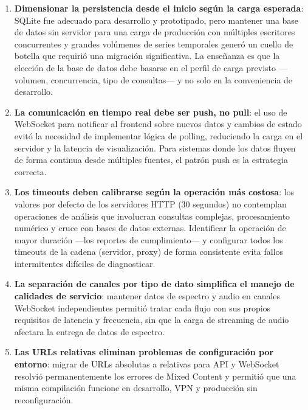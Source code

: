 \begin{enumerate}
    \item \textbf{Dimensionar la persistencia desde el inicio según la carga
    esperada}: SQLite fue adecuado para desarrollo y prototipado, pero
    mantener una base de datos sin servidor para una carga de producción con
    múltiples escritores concurrentes y grandes volúmenes de series temporales
    generó un cuello de botella que requirió una migración significativa. La
    enseñanza es que la elección de la base de datos debe basarse en el perfil
    de carga previsto —volumen, concurrencia, tipo de consultas— y no solo en
    la conveniencia de desarrollo.

    \item \textbf{La comunicación en tiempo real debe ser push, no pull}: el
    uso de WebSocket para notificar al frontend sobre nuevos datos y cambios
    de estado evitó la necesidad de implementar lógica de polling, reduciendo
    la carga en el servidor y la latencia de visualización. Para sistemas
    donde los datos fluyen de forma continua desde múltiples fuentes, el
    patrón push es la estrategia correcta.

    \item \textbf{Los timeouts deben calibrarse según la operación más
    costosa}: los valores por defecto de los servidores HTTP (30 segundos) no
    contemplan operaciones de análisis que involucran consultas complejas,
    procesamiento numérico y cruce con bases de datos externas. Identificar la
    operación de mayor duración —los reportes de cumplimiento— y configurar
    todos los timeouts de la cadena (servidor, proxy) de forma consistente
    evita fallos intermitentes difíciles de diagnosticar.

    \item \textbf{La separación de canales por tipo de dato simplifica el
    manejo de calidades de servicio}: mantener datos de espectro y audio en
    canales WebSocket independientes permitió tratar cada flujo con sus
    propios requisitos de latencia y frecuencia, sin que la carga de
    streaming de audio afectara la entrega de datos de espectro.

    \item \textbf{Las URLs relativas eliminan problemas de configuración por
    entorno}: migrar de URLs absolutas a relativas para API y WebSocket
    resolvió permanentemente los errores de Mixed Content y permitió que una
    misma compilación funcione en desarrollo, VPN y producción sin
    reconfiguración.


\end{enumerate}
